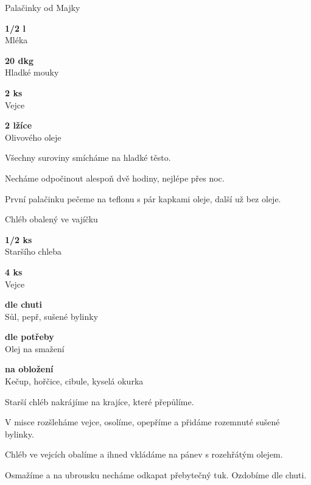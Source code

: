 \documentclass[11pt,a4paper]{article}
\begin{document}
\begin{recipe}[Tan]{Palačinky od Majky}
    \begin{ingredients}
        \item \parbox[t]{\linewidth}{\raggedright \liquid \textbf{1/2 l}\\ Mléka}
        \item \parbox[t]{\linewidth}{\raggedright \weight \textbf{20 dkg}\\ Hladké mouky}
        \item \parbox[t]{\linewidth}{\raggedright \piece \textbf{2 ks}\\ Vejce}
        \item \parbox[t]{\linewidth}{\raggedright \spoon \textbf{2 lžíce}\\ Olivového oleje}
    \end{ingredients}
    \begin{steps}
        \item Všechny suroviny smícháme na hladké těsto.
        \item Necháme odpočinout alespoň dvě hodiny, nejlépe přes noc.
        \item První palačinku pečeme na teflonu s pár kapkami oleje, další už bez oleje.
    \end{steps}
\end{recipe}

\begin{recipe}[Wheat]{Chléb obalený ve vajíčku}
    \begin{ingredients}
        \item \parbox[t]{\linewidth}{\raggedright \piece \textbf{1/2 ks}\\ Staršího chleba}
        \item \parbox[t]{\linewidth}{\raggedright \piece \textbf{4 ks}\\ Vejce}
        \item \parbox[t]{\linewidth}{\raggedright \indefinite \textbf{dle chuti}\\ Sůl, pepř, sušené bylinky}
        \item \parbox[t]{\linewidth}{\raggedright \liquid \textbf{dle potřeby}\\ Olej na smažení}
        \item \parbox[t]{\linewidth}{\raggedright \indefinite \textbf{na obložení}\\ Kečup, hořčice, cibule, kyselá okurka}
    \end{ingredients}
    \begin{steps}
        \item Starší chléb nakrájíme na krajíce, které přepůlíme.
        \item V misce rozšleháme vejce, osolíme, opepříme a přidáme rozemnuté sušené bylinky.
        \item Chléb ve vejcích obalíme a ihned vkládáme na pánev s rozehřátým olejem.
        \item Osmažíme a na ubrousku necháme odkapat přebytečný tuk. Ozdobíme dle chuti.
    \end{steps}
\end{recipe}
\end{document}
